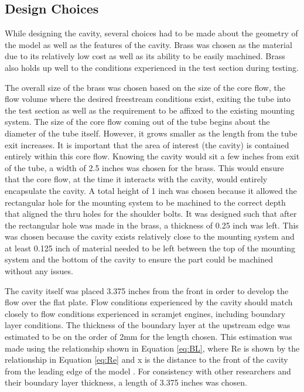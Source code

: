 \subsection{Design Choices}

While designing the cavity, several choices had to be made about the geometry of the model as well as the features of the cavity. Brass was chosen as the material due to its relatively low cost as well as its ability to be easily machined. Brass also holds up well to the conditions experienced in the test section during testing. 

The overall size of the brass was chosen based on the size of the core flow, the flow volume where the desired freestream conditions exist, exiting the tube into the test section as well as the requirement to be affixed to the existing mounting system. The size of the core flow coming out of the tube begins about the diameter of the tube itself. However, it grows smaller as the length from the tube exit increases. It is important that the area of interest (the cavity) is contained entirely within this core flow. Knowing the cavity would sit a few inches from exit of the tube, a width of 2.5 inches was chosen for the brass. This would ensure that the core flow, at the time it interacts with the cavity, would entirely encapsulate the cavity. A total height of 1 inch was chosen because it allowed the rectangular hole for the mounting system to be machined to the correct depth that aligned the thru holes for the shoulder bolts. It was designed such that after the rectangular hole was made in the brass, a thickness of 0.25 inch was left. This was chosen because the cavity exists relatively close to the mounting system and at least 0.125 inch of material needed to be left between the top of the mounting system and the bottom of the cavity to ensure the part could be machined without any issues. 

The cavity itself was placed 3.375 inches from the front in order to develop the flow over the flat plate. Flow conditions experienced by the cavity should match closely to flow conditions experienced in scramjet engines, including boundary layer conditions. The thickness of the boundary layer at the upstream edge was estimated to be on the order of 2mm for the length chosen. This estimation was made using the relationship shown in Equation \ref{eq:BL}, where Re is shown by the relationship in Equation \ref{eq:Re} and x is the distance to the front of the cavity from the leading edge of the model \cite{cengel2010fluid}. For consistency with other researchers and their boundary layer thickness, a length of 3.375 inches was chosen.

